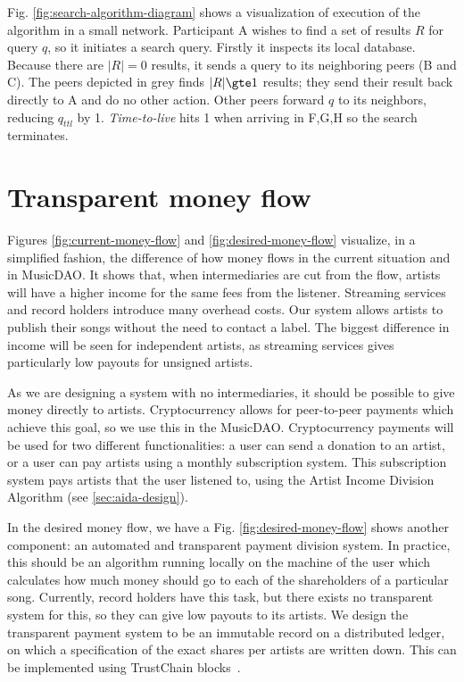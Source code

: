 Fig. \ref{fig:search-algorithm-diagram} shows a visualization of execution of the algorithm in a small network. Participant A wishes to find a set of results $R$ for query $q$, so it initiates a search query. Firstly it inspects its local database. Because there are $|R|=0$ results, it sends a query to its neighboring peers (B and C). The peers depicted in grey finds $|R|\gte 1$ results; they send their result back directly to A and do no other action. Other peers forward $q$ to its neighbors, reducing $q_{ttl}$ by 1. \textit{Time-to-live} hits 1 when arriving in F,G,H so the search terminates. 

\section{Transparent money flow}
Figures \ref{fig:current-money-flow} and \ref{fig:desired-money-flow} visualize, in a simplified fashion, the difference of how money flows in the current situation and in MusicDAO. It shows that, when intermediaries are cut from the flow, artists will have a higher income for the same fees from the listener. Streaming services and record holders introduce many overhead costs. Our system allows artists to publish their songs without the need to contact a label. The biggest difference in income will be seen for independent artists, as streaming services gives particularly low payouts for unsigned artists.

As we are designing a system with no intermediaries, it should be possible to give money directly to artists. Cryptocurrency allows for peer-to-peer payments which achieve this goal, so we use this in the MusicDAO. Cryptocurrency payments will be used for two different functionalities: a user can send a donation to an artist, or a user can pay artists using a monthly subscription system. This subscription system pays artists that the user listened to, using the Artist Income Division Algorithm (see \ref{sec:aida-design}). 

In the desired money flow, we have a  Fig. \ref{fig:desired-money-flow} shows another component: an automated and transparent payment division system. In practice, this should be an algorithm running locally on the machine of the user which calculates how much money should go to each of the shareholders of a particular song. Currently, record holders have this task, but there exists no transparent system for this, so they can give low payouts to its artists. We design the transparent payment system to be an immutable record on a distributed ledger, on which a specification of the exact shares per artists are written down. This can be implemented using TrustChain blocks~\citep{otte2017trustchain}.


